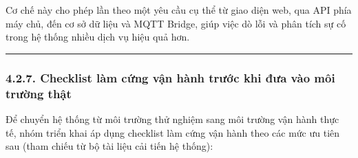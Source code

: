 \documentclass[a4paper]{extarticle}
\begin{document}
Cơ chế này cho phép lần theo một yêu cầu cụ thể từ giao diện web, qua
API phía máy chủ, đến cơ sở dữ liệu và MQTT Bridge, giúp việc dò lỗi
và phân tích sự cố trong hệ thống nhiều dịch vụ hiệu quả hơn.

\begin{center}\rule{0.5\linewidth}{0.5pt}\end{center}

\subsubsection{4.2.7. Checklist làm cứng vận hành trước khi đưa vào môi
trường thật}\label{427-checklist-hardening-trux1b0ux1edbc-khi-vux1eadn-huxe0nh-production}

Để chuyển hệ thống từ môi trường thử nghiệm sang môi trường vận hành
thực tế, nhóm triển khai áp dụng checklist làm cứng vận hành theo các mức ưu
tiên sau (tham chiếu từ bộ tài liệu cải tiến hệ thống):
\end{document}
